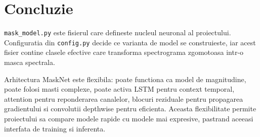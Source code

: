\documentclass[12pt,a4paper]{report}
\begin{document}
\chapter{Concluzie}

\texttt{mask\_model.py} este fisierul care defineste nucleul neuronal al
proiectului. Configuratia din \texttt{config.py} decide ce varianta de model se
construieste, iar acest fisier contine clasele efective care transforma
spectrograma zgomotoasa intr-o masca spectrala.

Arhitectura MaskNet este flexibila: poate functiona ca model de magnitudine,
poate folosi masti complexe, poate activa LSTM pentru context temporal, attention
pentru reponderarea canalelor, blocuri reziduale pentru propagarea gradientului
si convolutii depthwise pentru eficienta. Aceasta flexibilitate permite proiectului
sa compare modele rapide cu modele mai expresive, pastrand aceeasi interfata de
training si inferenta.
\end{document}
